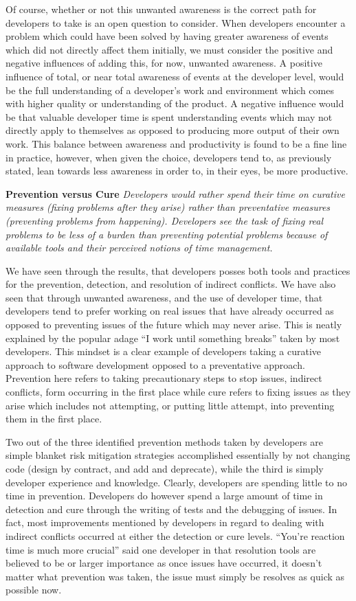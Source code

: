 \documentclass[conference]{IEEEtran}
\begin{document}
Of course, whether or not this unwanted awareness is the correct path for developers to take is an open question to consider. When
developers encounter a problem which could have been solved by having greater awareness of events which did not directly affect
them initially, we must consider the positive and negative influences of adding this, for now, unwanted awareness. A positive
influence of total, or near total
awareness of events at the developer level, would be the full understanding of a developer's work and environment which comes
with higher quality or understanding of the product.
A negative influence would be that valuable developer time is spent understanding events which may not directly apply to themselves as opposed to
producing more output of their own work. This balance between awareness and productivity is found to be a fine line in practice,
however, when given the choice, developers tend to, as previously stated, lean towards less awareness in order to, in their eyes,
be more productive.

\textbf{Prevention versus Cure}  \textit{Developers would rather spend their time on curative measures (fixing problems after they
arise) rather than preventative measures (preventing problems from happening). Developers see the task of fixing real problems
to be less of a burden than preventing potential problems because of available tools and their perceived notions of time management.}

We have seen through the results, that developers posses both tools and practices for the prevention,
detection, and resolution of indirect conflicts. We have also seen that through unwanted awareness, and the use of developer time,
that developers tend to prefer working on real issues that have already occurred as opposed to preventing issues of the future which
may never arise. This is neatly explained by the popular adage ``I work until something breaks'' taken by most developers. This mindset
is a clear example of developers taking a curative approach to software development opposed to a preventative approach.
Prevention here refers to taking precautionary steps to stop issues, indirect conflicts, form occurring in the first
place while cure refers to fixing issues as they arise which includes not attempting, or putting little attempt, into preventing
them in the first place.

Two out of the three identified prevention methods taken by developers are simple blanket risk mitigation strategies
accomplished essentially by
not changing code (design by contract, and add and deprecate), while the third is simply developer experience and knowledge. Clearly,
developers are spending little to no time in prevention. Developers do however spend a large amount of time in detection and cure through the
writing of tests and the debugging of issues. In fact, most improvements mentioned by developers in regard to dealing with indirect
conflicts occurred at either the detection or cure levels. ``You're reaction time is much more crucial''
said one developer in that resolution tools are believed to be or larger importance as once issues have occurred, it doesn't
matter what prevention was taken, the issue must simply be resolves as quick as possible now.
\end{document}
